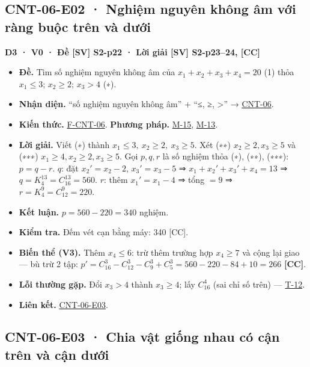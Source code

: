 \documentclass[
  10pt,
  twoside,openany]{book}
\providecommand{\tightlist}{%
  \setlength{\itemsep}{0pt}\setlength{\parskip}{0pt}}
\begin{document}
\hypertarget{CNT-06-E02}{%
\subsection{CNT-06-E02 · Nghiệm nguyên không âm với ràng buộc trên và
dưới}\label{CNT-06-E02}}

\textbf{D3 · V0 · Đề {[}SV{]} S2-p22 · Lời giải {[}SV{]} S2-p23--24,
{[}CC{]}}

\begin{itemize}
\tightlist
\item
  \textbf{Đề.} Tìm số nghiệm nguyên không âm của \(x_1+x_2+x_3+x_4=20\)
  (1) thỏa \(x_1\le3\); \(x_2\ge2\); \(x_3>4\) (∗).
\item
  \textbf{Nhận diện.} ``số nghiệm nguyên không âm'' + ``≤, ≥,
  \textgreater{}'' → \protect\hyperlink{CNT-06}{CNT-06}.
\item
  \textbf{Kiến thức.} \protect\hyperlink{F-CNT-06}{F-CNT-06}.
  \textbf{Phương pháp.} \protect\hyperlink{M-15}{M-15},
  \protect\hyperlink{M-13}{M-13}.
\item
  \textbf{Lời giải.} Viết (∗) thành \(x_1\le3,\ x_2\ge2,\ x_3\ge5\). Xét
  (∗∗) \(x_2\ge2,x_3\ge5\) và (∗∗∗) \(x_1\ge4,x_2\ge2,x_3\ge5\). Gọi
  \(p,q,r\) là số nghiệm thỏa (∗), (∗∗), (∗∗∗): \(p=q-r\). \(q\): đặt
  \(x_2'=x_2-2\), \(x_3'=x_3-5\) ⇒ \(x_1+x_2'+x_3'+x_4=13\) ⇒
  \(q=K_4^{13}=C_{16}^{13}=560\). \(r\): thêm \(x_1'=x_1-4\) ⇒ tổng
  \(=9\) ⇒ \(r=K_4^9=C_{12}^9=220\).
\item
  \textbf{Kết luận.} \(p=560-220=340\) nghiệm.
\item
  \textbf{Kiểm tra.} Đếm vét cạn bằng máy: 340 {[}CC{]}.
\item
  \textbf{Biến thể (V3).} Thêm \(x_4\le6\): trừ thêm trường hợp
  \(x_4\ge7\) và cộng lại giao --- bù trừ 2 tập:
  \(p'=C_{16}^{3}-C_{12}^{3}-C_{9}^{3}+C_{5}^{3}=560-220-84+10=266\)
  \textbf{{[}CC{]}}.
\item
  \textbf{Lỗi thường gặp.} Đổi \(x_3>4\) thành \(x_3\ge4\); lấy
  \(C_{16}^{4}\) (sai chỉ số trên) --- \protect\hyperlink{T-12}{T-12}.
\item
  \textbf{Liên kết.} \protect\hyperlink{CNT-06-E03}{CNT-06-E03}.
\end{itemize}

\hypertarget{CNT-06-E03}{%
\subsection{CNT-06-E03 · Chia vật giống nhau có cận trên và cận
dưới}\label{CNT-06-E03}}
\end{document}
